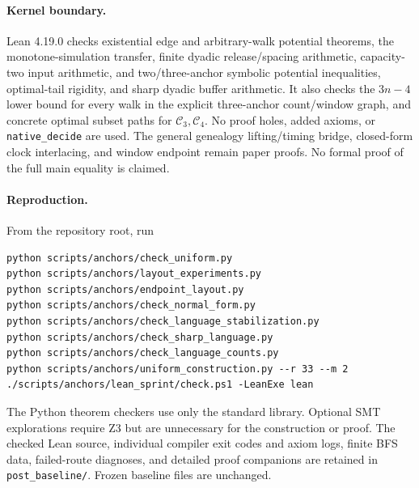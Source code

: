 \documentclass[11pt]{article}
\newcommand{\C}{\mathcal C}
\begin{document}
\paragraph{Kernel boundary.}
Lean 4.19.0 checks existential edge and arbitrary-walk potential theorems,
the monotone-simulation transfer, finite dyadic release/spacing arithmetic,
capacity-two input arithmetic, and two/three-anchor symbolic potential
inequalities, optimal-tail rigidity, and sharp dyadic buffer arithmetic.
It also checks the $3n-4$ lower bound for every walk in the
explicit three-anchor count/window graph, and concrete optimal subset
paths for $\C_3,\C_4$. No proof holes, added axioms, or
\texttt{native\_decide} are used. The general genealogy lifting/timing
bridge, closed-form clock interlacing, and window endpoint remain paper
proofs. No formal proof of the full main equality is claimed.

\paragraph{Reproduction.}
From the repository root, run
\begin{verbatim}
python scripts/anchors/check_uniform.py
python scripts/anchors/layout_experiments.py
python scripts/anchors/endpoint_layout.py
python scripts/anchors/check_normal_form.py
python scripts/anchors/check_language_stabilization.py
python scripts/anchors/check_sharp_language.py
python scripts/anchors/check_language_counts.py
python scripts/anchors/uniform_construction.py --r 33 --m 2
./scripts/anchors/lean_sprint/check.ps1 -LeanExe lean
\end{verbatim}
The Python theorem checkers use only the standard library. Optional SMT
explorations require Z3 but are unnecessary for the construction or proof.
The checked Lean source, individual compiler exit codes and axiom logs,
finite BFS data, failed-route diagnoses, and detailed proof companions are
retained in \texttt{post\_baseline/}. Frozen baseline files are unchanged.
\end{document}
